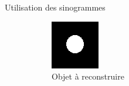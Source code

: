 \documentclass{beamer}
\begin{document}
\begin{frame}{Utilisation des sinogrammes}
    \begin{figure}[t]
        \centering
        \begin{subfigure}[b]{0.45\textwidth}
            \includegraphics[width=\textwidth]{image-reduite.png}
            \caption{Objet à reconstruire}
        \end{subfigure}
        \pause
        \qquad \qquad 
        \begin{subfigure}[b]{0.2\textwidth}

\end{subfigure}
\end{figure}
\end{frame}
\end{document}
